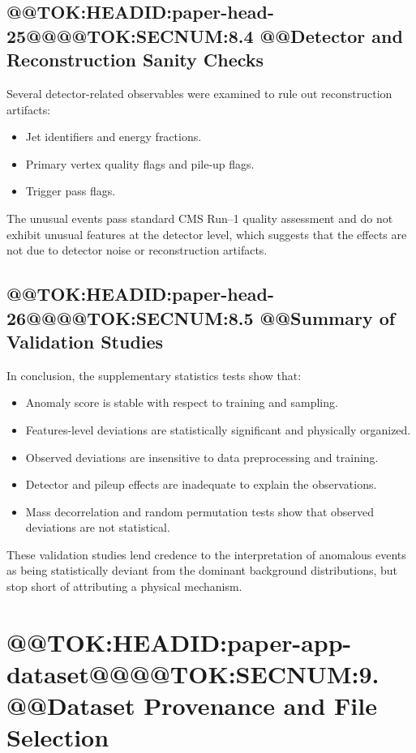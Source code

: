\documentclass[11pt]{article}
\begin{document}
\subsection{@@TOK:HEADID:paper-head-25@@@@TOK:SECNUM:8.4 @@Detector and Reconstruction Sanity Checks}

Several detector-related observables were examined to rule out reconstruction artifacts:

\begin{itemize}
    \item Jet identifiers and energy fractions.
    \item Primary vertex quality flags and pile-up flags.
    \item Trigger pass flags.
\end{itemize}

The unusual events pass standard CMS Run--1 quality assessment and do not exhibit unusual features at the detector level, which suggests that the effects are not due to detector noise or reconstruction artifacts.

\subsection{@@TOK:HEADID:paper-head-26@@@@TOK:SECNUM:8.5 @@Summary of Validation Studies}

In conclusion, the supplementary statistics tests show that: 
\begin{itemize}
   \item Anomaly score is stable with respect to training and sampling. 
   \item Features-level deviations are statistically significant and physically organized. 
   \item Observed deviations are insensitive to data preprocessing and training. 
   \item Detector and pileup effects are inadequate to explain the observations. 
   \item Mass decorrelation and random permutation tests show that observed deviations are not statistical. 
\end{itemize}

These validation studies lend credence to the interpretation of anomalous events as being statistically deviant from the dominant background distributions, but stop short of attributing a physical mechanism.

\section{@@TOK:HEADID:paper-app-dataset@@@@TOK:SECNUM:9. @@Dataset Provenance and File Selection}
\end{document}
